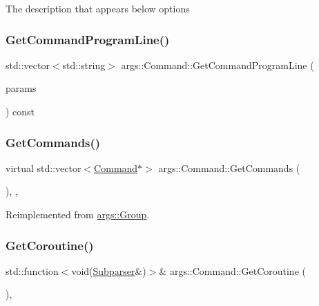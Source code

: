 The description that appears below options \mbox{\label{classargs_1_1_command_aafb4485ab3ff22ee4d52339e098647c6}} 
\subsubsection{\texorpdfstring{Get\+Command\+Program\+Line()}{GetCommandProgramLine()}}
{\footnotesize\ttfamily std\+::vector$<$std\+::string$>$ args\+::\+Command\+::\+Get\+Command\+Program\+Line (\begin{DoxyParamCaption}\item[{const \hyperlink{structargs_1_1_help_params}{Help\+Params} \&}]{params }\end{DoxyParamCaption}) const\hspace{0.3cm}{\ttfamily [inline]}}

\mbox{\label{classargs_1_1_command_a59511be164aa3a0cc5fbbfb75ca79fec}} 
\subsubsection{\texorpdfstring{Get\+Commands()}{GetCommands()}}
{\footnotesize\ttfamily virtual std\+::vector$<$\hyperlink{classargs_1_1_command}{Command}$\ast$$>$ args\+::\+Command\+::\+Get\+Commands (\begin{DoxyParamCaption}{ }\end{DoxyParamCaption})\hspace{0.3cm}{\ttfamily [inline]}, {\ttfamily [override]}, {\ttfamily [virtual]}}



Reimplemented from \hyperlink{classargs_1_1_group_a83b0a40e16d92c0f387d00a0f35dbf17}{args\+::\+Group}.

\mbox{\label{classargs_1_1_command_ac026b5eeed24051bea59ff41350863d0}} 
\subsubsection{\texorpdfstring{Get\+Coroutine()}{GetCoroutine()}}
{\footnotesize\ttfamily std\+::function$<$void(\hyperlink{classargs_1_1_subparser}{Subparser}\&)$>$\& args\+::\+Command\+::\+Get\+Coroutine (\begin{DoxyParamCaption}{ }\end{DoxyParamCaption})\hspace{0.3cm}{\ttfamily [inline]}, {\ttfamily [protected]}}

